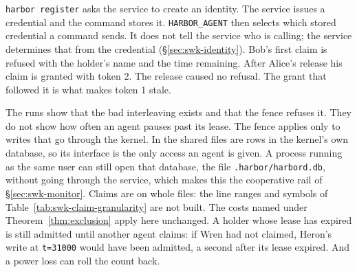 
\texttt{harbor register} asks the service to create an identity. The
service issues a credential and the command stores it. \texttt{HARBOR\_AGENT}
then selects which stored credential a command sends. It does not tell the
service who is calling; the service determines that from the credential
(\S\ref{sec:swk-identity}). Bob's first claim is refused with the holder's
name and the time remaining. After Alice's release his claim is granted with
token 2. The release caused no refusal. The grant that followed it is what
makes token 1 stale.

\begin{pdboundary}
\setlength{\parskip}{4pt plus 1pt}
The runs show that the bad interleaving exists and that the fence refuses it.
They do not show how often an agent pauses past its lease. The fence applies
only to writes that go through the kernel. In \pdkernelname{} the shared
files are rows in the kernel's own database, so its interface is the only
access an agent is given. A process running as the same user can still open
that database, the file \texttt{.harbor/harbord.db}, without going through
the service, which makes this the cooperative rail of
\S\ref{sec:swk-monitor}. Claims are on whole files: the line ranges and
symbols of Table~\ref{tab:swk-claim-granularity} are not built. The costs
named under Theorem~\ref{thm:exclusion} apply here unchanged. A holder whose
lease has expired is still admitted until another agent claims: if Wren had
not claimed, Heron's write at \texttt{t=31000} would have been admitted, a
second after its lease expired. And a power loss can roll the count back.
\end{pdboundary}
